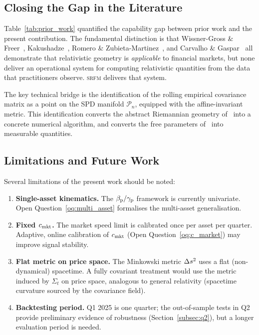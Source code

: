 \subsection{Closing the Gap in the Literature}

Table~\ref{tab:prior_work} quantified the capability gap between prior work
and the present contribution.  The fundamental distinction is that
Wissner-Gross \& Freer~\cite{WissnerGross2010}, Kakushadze~\cite{Kakushadze2017},
Romero \& Zubieta-Martinez~\cite{Romero2016}, and Carvalho \& Gaspar~\cite{Carvalho2021}
all demonstrate that relativistic geometry is \emph{applicable} to financial
markets, but none deliver an operational system for computing relativistic
quantities from the \ohlcv{} data that practitioners observe.  \textsc{srfm}
delivers that system.

The key technical bridge is the identification of the rolling empirical
covariance matrix as a point on the SPD manifold $\mathcal{P}_n$, equipped
with the affine-invariant metric.  This identification converts the abstract
Riemannian geometry of~\cite{Carvalho2021} into a concrete numerical algorithm,
and converts the free parameters of~\cite{Kakushadze2017} into measurable quantities.

\subsection{Limitations and Future Work}

Several limitations of the present work should be noted:

\begin{enumerate}
  \item \textbf{Single-asset kinematics.}  The $\beta_{\mathrm{p}}/\gamma_{\mathrm{p}}$ framework is
        currently univariate.  Open Question~\ref{oq:multi_asset} formalises
        the multi-asset generalisation.

  \item \textbf{Fixed $c_{\mathrm{mkt}}$.}  The market speed limit is calibrated once
        per asset per quarter.  Adaptive, online calibration of $c_{\mathrm{mkt}}$
        (Open Question~\ref{oq:c_market}) may improve signal stability.

  \item \textbf{Flat metric on price space.}  The Minkowski metric
        $\Delta s^2$ uses a flat (non-dynamical) spacetime.  A fully
        covariant treatment would use the metric induced by $\Sigma_t$ on
        price space, analogous to general relativity (spacetime curvature
        sourced by the covariance field).

  \item \textbf{Backtesting period.}  Q1 2025 is one quarter; the out-of-sample
        tests in Q2 provide preliminary evidence of robustness
        (Section~\ref{subsec:q2}), but a longer evaluation period is needed.
\end{enumerate}

